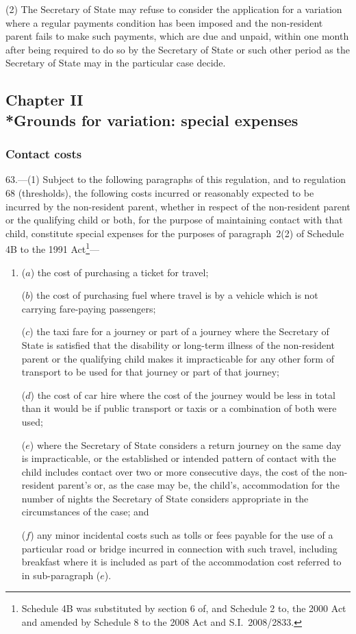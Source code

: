 \documentclass[12pt,a4paper]{article}
\begin{document}
(2) The Secretary of State may refuse to consider the application for a variation where a regular payments condition has been imposed and the non-resident parent fails to make such payments, which are due and unpaid, within one month after being required to do so by the Secretary of State or such other period as the Secretary of State may in the particular case decide.

\subsection[Chapter II --- Grounds for variation: special expenses]{Chapter II\\*Grounds for variation: special expenses}

\renewcommand\parthead{--- Part V Chapter II}

\subsubsection[63. Contact costs]{Contact costs}

63.---(1)  Subject to the following paragraphs of this regulation, and to regulation 68 (thresholds), the following costs incurred or reasonably expected to be incurred by the non-resident parent, whether in respect of the non-resident parent or the qualifying child or both, for the purpose of maintaining contact with that child, constitute special expenses for the purposes of paragraph~2(2) of Schedule 4B to the 1991 Act\footnote{Schedule 4B was substituted by section 6 of, and Schedule 2 to, the 2000 Act and amended by Schedule 8 to the 2008 Act and S.I.~2008/2833.}—
\begin{enumerate}\item[]
($a$) the cost of purchasing a ticket for travel;

($b$) the cost of purchasing fuel where travel is by a vehicle which is not carrying fare-paying passengers;

($c$) the taxi fare for a journey or part of a journey where the Secretary of State is satisfied that the disability or long-term illness of the non-resident parent or the qualifying child makes it impracticable for any other form of transport to be used for that journey or part of that journey;

($d$) the cost of car hire where the cost of the journey would be less in total than it would be if public transport or taxis or a combination of both were used;

($e$) where the Secretary of State considers a return journey on the same day is impracticable, or the established or intended pattern of contact with the child includes contact over two or more consecutive days, the cost of the non-resident parent’s or, as the case may be, the child’s, accommodation for the number of nights the Secretary of State considers appropriate in the circumstances of the case; and

($f$) any minor incidental costs such as tolls or fees payable for the use of a particular road or bridge incurred in connection with such travel, including breakfast where it is included as part of the accommodation cost referred to in sub-paragraph ($e$).
\end{enumerate}
\end{document}
